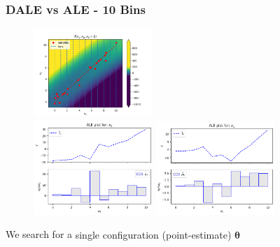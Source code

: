 \documentclass{beamer}
\newcommand{\thetab}{\boldsymbol{\theta}}
\begin{document}
\begin{frame}
  \frametitle{DALE vs ALE - 10 Bins}
  \begin{figure}[ht]
    \centering
    \includegraphics[width=0.4\textwidth]{./figures/bin_splitting_10_bins.png}\\
    \includegraphics[width=0.4\textwidth]{./figures/dale_10_bins.png}
    \includegraphics[width=0.4\textwidth]{./figures/ale_10_bins.png}
    \label{}
  \end{figure}
  \noindent\makebox[\linewidth]{\rule{\paperwidth}{0.4pt}}
  We search for a \alert{single configuration (point-estimate) \( \hat{\thetab}\) }
\end{frame}
\end{document}
